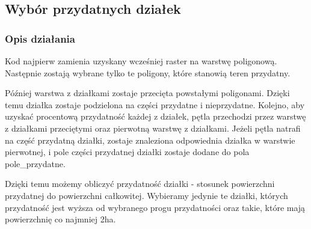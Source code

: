 \documentclass{article}
\begin{document}
\subsection{Wybór przydatnych działek}
\subsubsection{Opis działania}
Kod najpierw zamienia uzyskany wcześniej raster na warstwę poligonową. Następnie zostają wybrane tylko te poligony, które stanowią teren przydatny.

Później warstwa z działkami zostaje przecięta powstałymi poligonami. Dzięki temu działka zostaje podzielona na części przydatne i nieprzydatne. Kolejno, aby uzyskać procentową przydatność każdej z działek, pętla przechodzi przez warstwę z działkami przeciętymi oraz pierwotną warstwę z działkami. 
Jeżeli pętla natrafi na część przydatną działki, zostaje znaleziona odpowiednia działka w warstwie pierwotnej, i pole części przydatnej działki zostaje dodane do pola pole\_przydatne.

Dzięki temu możemy obliczyć przydatność działki - stosunek powierzchni przydatnej do powierzchni całkowitej. Wybieramy jedynie te działki, których przydatność jest wyższa od wybranego progu przydatności oraz takie, które mają powierzchnię co najmniej 2ha.
\end{document}

